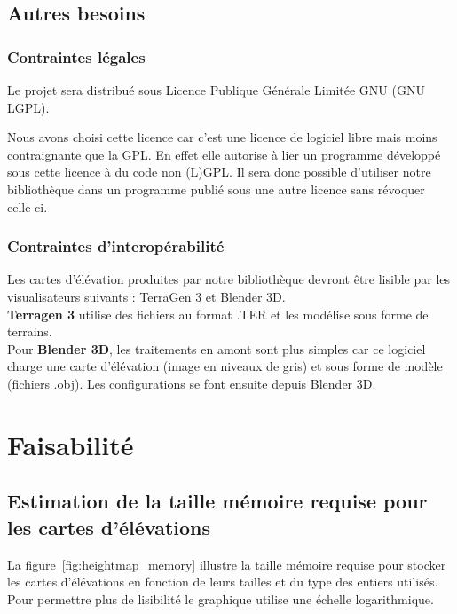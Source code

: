 \section{Autres besoins}
\subsection{Contraintes légales}
Le projet sera distribué sous Licence Publique Générale Limitée GNU (GNU LGPL).

Nous avons choisi cette licence car c'est une licence de logiciel libre mais
moins contraignante que la GPL. En effet elle autorise à lier un programme
développé sous cette licence à du code non (L)GPL. Il sera donc possible d'utiliser notre bibliothèque dans un programme publié sous une autre licence sans révoquer celle-ci.

\subsection{Contraintes d'interopérabilité}
Les cartes d'élévation produites par notre bibliothèque devront être lisible par les visualisateurs
 suivants : TerraGen 3 et Blender 3D.\\
\textbf{Terragen 3} utilise des fichiers au format .TER et les modélise sous forme de terrains.\\
Pour \textbf{Blender 3D}, les traitements en amont sont plus simples car ce logiciel charge
une carte d'élévation (image en niveaux de gris) et sous forme de modèle (fichiers
.obj).
Les configurations se font ensuite depuis Blender 3D.


\chapter{Faisabilité}
\section{Estimation de la taille mémoire requise pour les cartes d'élévations}
La figure~\ref{fig:heightmap_memory} illustre la taille mémoire requise pour
stocker les cartes d'élévations en fonction de leurs tailles et du type des entiers
utilisés. Pour permettre plus de lisibilité le graphique utilise une échelle
logarithmique.\\

